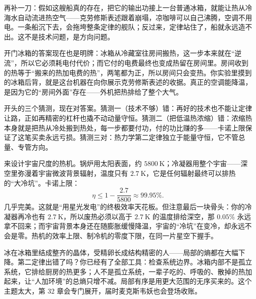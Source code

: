 再补一刀：假如这艘船真的存在，把它的输出功接上一台普通冰箱，就能让热从冷海水自动流进热空气——克劳修斯表述跟着崩塌，凉咖啡可以自己沸腾，空调不用电。一条船沉下去，会拖垮整条定律的舰队；反过来，定律站住了，船就永远造不出。这不是技术问题，是方向问题。

开门冰箱的答案现在也是明牌：冰箱从冷藏室往房间搬热，这一步本来就在“逆流”，所以它必须耗电付代价；而它付的电费最终也变成热留在房间里。房间收到的热等于“搬来的热加电费的热”，两笔都为正，所以房间只会变热。你实验里摸到的冰箱后背，就是这台机器在向你展示克劳修斯表述的收据。真正的空调能降温，是因为它的“房间外面”存在——外机把热排给了整个大气。

开头的三个猜测，现在对答案。猜测一（技术不够）错：再好的技术也不能让定律让路，正如再精密的杠杆也撬不动动量守恒。猜测二（把低温热浓缩）错：浓缩热本身就是把热从冷处搬到热处，每一步都要付功，付的功比赚的多——卡诺上限保证了这笔买卖永远亏损。猜测三对：热力学第二定律独立于能量守恒，它不管总量、专管方向。


\begin{thought}
来设计宇宙尺度的热机。锅炉用太阳表面，约 \(5800\ \mathrm{K}\)；冷凝器用整个宇宙——深空里弥漫着宇宙微波背景辐射，温度只有 \(2.7\ \mathrm{K}\)，它是任何辐射最终可以排热的“大冷坑”。卡诺上限：
\[
\eta\leq 1-\frac{2.7}{5800}\approx 99.95\%.
\]
几乎完美。这就是“用星光发电”的终极效率天花板。但注意最后一块骨头：你的冷凝器再冷也有 \(2.7\ \mathrm{K}\)，所以废热必须以高于 \(2.7\ \mathrm{K}\) 的温度排给深空，那 \(0.05\%\) 永远拿不回来；而宇宙背景本身还在随膨胀缓慢降温，宇宙的“冷坑”在变冷，却永远不会是零。热机的效率上限、制冷机的零度下限，在同一片星空下握手。
\end{thought}

\begin{thought}[冰箱和生命违反第二定律吗]
冰在冰箱里结成整齐的晶体，受精卵长成结构精密的人——局部的熵都在大幅下降。第二定律出错了吗？你已经有了全部工具：检查系统边界。冰箱内部不是孤立系统，它排给厨房的热更多；人不是孤立系统，一辈子吃的、呼吸的、散掉的热加起来，让“人加环境”的总熵只增不减。局部有序是用更大范围的无序买来的。这个主题太大，第 32 章会专门展开，届时麦克斯韦妖也会登场收账。
\end{thought}

